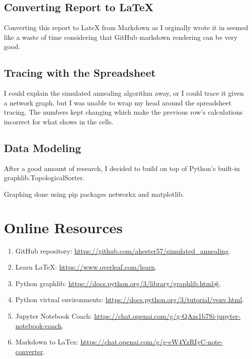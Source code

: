 \documentclass{article}
\begin{document}
\subsection{Converting Report to LaTeX}

Converting this report to LateX from Markdown as I orginally wrote it in 
seemed like a waste of time considering that GitHub markdown rendering can 
be very good.

\subsection{Tracing with the Spreadsheet}

I could explain the simulated annealing algorithm away, or I could trace it 
given a network graph, but I was unable to wrap my head around the spreadsheet 
tracing. The numbers kept changing which make the previous row's calculations 
incorrect for what shows in the cells.

\subsection{Data Modeling}

After a good amount of research, I decided to build on top of Python's built-in 
graphlib.TopologicalSorter.

Graphing done using pip packages networkx and matplotlib.

\section{Online Resources}

\begin{enumerate}
    \item GitHub repository: \url{https://github.com/ahester57/simulated_annealing}.
    \item Learn LaTeX: \url{https://www.overleaf.com/learn}.
    \item Python graphlib: \url{https://docs.python.org/3/library/graphlib.html#}.
    \item Python virtual environments: \url{https://docs.python.org/3/tutorial/venv.html}.
    \item Jupyter Notebook Coach: \url{https://chat.openai.com/g/g-QAzs1b7Si-jupyter-notebook-coach}.
    \item Markdown to LaTex: \url{https://chat.openai.com/g/g-eW4YzRIyC-note-converter}.
\end{enumerate}
\end{document}
